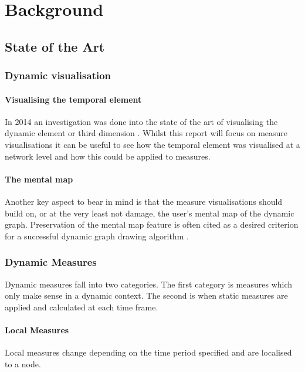 
\chapter{Background}

\section{State of the Art}
\subsection{Dynamic visualisation}
\label{sec:sec21}
\subsubsection{Visualising the temporal element}
\label{sec:subsec21}
In 2014 an investigation was done into the state of the art of visualising the dynamic element or third dimension \cite{tsotaivg}. Whilst this report will focus on measure visualisations it can be useful to see how the temporal element was visualised at a network level and how this could be applied to measures. 

\subsubsection{The mental map}
\label{sec:subsec21}
Another key aspect to bear in mind is that the measure visualisations should build on, or at the very least not damage, the user's mental map of the dynamic graph. Preservation of the mental map feature is often cited as a desired criterion for a successful dynamic graph drawing algorithm \cite{tmitmmeridgd}. 

\subsection{Dynamic Measures}
\label{sec:sec22}
Dynamic measures fall into two categories. The first category is measures which only make sense in a dynamic context. The second is when static measures are applied and calculated at each time frame.

\subsubsection{Local Measures}
Local measures change depending on the time period specified and are localised to a node. 

